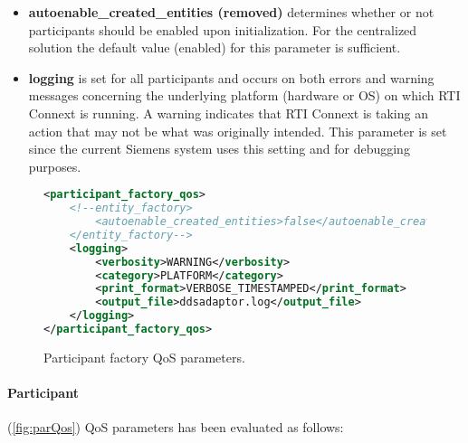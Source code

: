 \begin{itemize}
	\item \textbf{autoenable\_created\_entities (removed)} determines whether or not participants should be enabled upon initialization. For the centralized solution the default value (enabled) for this parameter is sufficient.
	\item \textbf{logging} is set for all participants and occurs on both errors and warning messages concerning the underlying platform (hardware or OS) on which RTI Connext is running. A warning indicates that RTI Connext is taking an action that may not be what was originally intended. This parameter is set since the current Siemens system uses this setting and for debugging purposes.
\end{itemize}

\begin{figure}
\begin{lstlisting}[language=XML]
<participant_factory_qos>
	<!--entity_factory>
		<autoenable_created_entities>false</autoenable_created_entities>
	</entity_factory-->
	<logging>
		<verbosity>WARNING</verbosity>
		<category>PLATFORM</category>
		<print_format>VERBOSE_TIMESTAMPED</print_format>
		<output_file>ddsadaptor.log</output_file>
	</logging>
</participant_factory_qos>
\end{lstlisting}
\caption[Participant factory QoS parameters]{
		\label{fig:parFacQos} 
		\footnotesize{Participant factory QoS parameters.}
	}
\end{figure}

\paragraph{Participant} (\cref{fig:parQos}) QoS parameters has been evaluated as follows:
 
